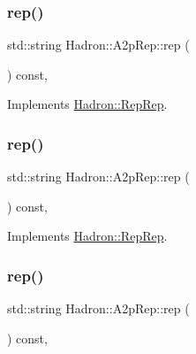 \subsubsection{\texorpdfstring{rep()}{rep()}\hspace{0.1cm}{\footnotesize\ttfamily [1/3]}}
{\footnotesize\ttfamily std\+::string Hadron\+::\+A2p\+Rep\+::rep (\begin{DoxyParamCaption}{ }\end{DoxyParamCaption}) const\hspace{0.3cm}{\ttfamily [inline]}, {\ttfamily [virtual]}}



Implements \mbox{\hyperlink{structHadron_1_1RepRep_ab3213025f6de249f7095892109575fde}{Hadron\+::\+Rep\+Rep}}.

\mbox{\label{structHadron_1_1A2pRep_a3ced5497d56bb36345560c2e3cb3d2e7}} 
\subsubsection{\texorpdfstring{rep()}{rep()}\hspace{0.1cm}{\footnotesize\ttfamily [2/3]}}
{\footnotesize\ttfamily std\+::string Hadron\+::\+A2p\+Rep\+::rep (\begin{DoxyParamCaption}{ }\end{DoxyParamCaption}) const\hspace{0.3cm}{\ttfamily [inline]}, {\ttfamily [virtual]}}



Implements \mbox{\hyperlink{structHadron_1_1RepRep_ab3213025f6de249f7095892109575fde}{Hadron\+::\+Rep\+Rep}}.

\mbox{\label{structHadron_1_1A2pRep_a3ced5497d56bb36345560c2e3cb3d2e7}} 
\subsubsection{\texorpdfstring{rep()}{rep()}\hspace{0.1cm}{\footnotesize\ttfamily [3/3]}}
{\footnotesize\ttfamily std\+::string Hadron\+::\+A2p\+Rep\+::rep (\begin{DoxyParamCaption}{ }\end{DoxyParamCaption}) const\hspace{0.3cm}{\ttfamily [inline]}, {\ttfamily [virtual]}}



